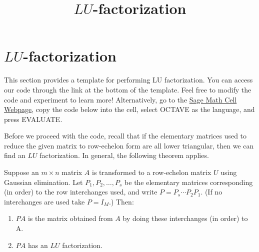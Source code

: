 \documentclass{ximera}
\title{$LU$-factorization} \license{CC BY-NC-SA 4.0}
\begin{document}
\begin{abstract}
\end{abstract}
\maketitle

\section*{$LU$-factorization}

This section provides a template for performing LU factorization.  You can access our code through the link at the bottom of the template.  Feel free to modify the code and experiment to learn more!  Alternatively, go to the \href{https://sagecell.sagemath.org/}{Sage Math Cell Webpage}, copy the code below into the cell, select OCTAVE as the language, and press EVALUATE. 

Before we proceed with the code, recall that if the elementary matrices used to reduce the given matrix to row-echelon form are all lower triangular, then we can find an $LU$ factorization.  In general, the following theorem applies.

\begin{theorem}[\ref{th:LUPA}]
Suppose an $m \times n$ matrix $A$ is transformed to a row-echelon matrix $U$ using Gaussian elimination. Let $P_1, P_2, \ldots, P_s$ be the elementary matrices corresponding (in order) to the row interchanges used,
and write $P=P_s \cdots P_2 P_1$. (If no interchanges are used take $P = I_M$.) Then:
\begin{enumerate}
\item $PA$ is the matrix obtained from $A$ by doing these interchanges (in order) to A.
\item $PA$ has an $LU$ factorization.
\end{enumerate}
\end{theorem}
\end{document}
